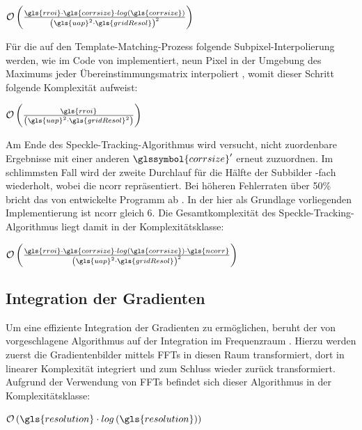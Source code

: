 \begin{center}
	$\mathcal{O}\left(\frac{\gls{rroi} \cdot \gls{corrsize} \cdot log\left(\gls{corrsize}\right)}{\left(\gls{uap}^2 \cdot \gls{gridResol}\right)^2}\right)$
\end{center}

Für die auf den Template-Matching-Prozess folgende Subpixel-Interpolierung werden, wie im Code von \citeauthor{Coj17} implementiert, neun Pixel in der Umgebung des Maximums jeder Übereinstimmungsmatrix interpoliert \cite{Coj17}, womit dieser Schritt folgende Komplexität aufweist:

\begin{center}
	$\mathcal{O}\left(\frac{\gls{rroi}}{\left(\gls{uap}^2 \cdot \gls{gridResol}^2\right)}\right)$
\end{center}

Am Ende des Speckle-Tracking-Algorithmus wird versucht, nicht zuordenbare Ergebnisse mit einer anderen  $\glssymbol{corrsize}'$ erneut zuzuordnen. Im schlimmsten Fall wird der zweite Durchlauf für die Hälfte der Subbilder -fach wiederholt, wobei  die \gls{ncorr} repräsentiert. Bei höheren Fehlerraten über 50\% bricht das von \citeauthor{Coj17} entwickelte Programm ab \cite{Coj17}. In der hier als Grundlage vorliegenden Implementierung ist \gls{ncorr} gleich 6. Die Gesamtkomplexität des Speckle-Tracking-Algorithmus liegt damit in der Komplexitätsklasse:

\begin{center}
	$\mathcal{O}\left(\frac{\gls{rroi} \cdot \gls{corrsize} \cdot log\left(\gls{corrsize}\right) \cdot \gls{ncorr}}{\left(\gls{uap}^2 \cdot \gls{gridResol}\right)^2}\right)$
\end{center}

\subsection{Integration der Gradienten}

Um eine effiziente Integration der Gradienten zu ermöglichen, beruht der von \citeauthor{FC88} vorgeschlagene Algorithmus auf der Integration im Frequenzraum \cite{FC88}. Hierzu werden zuerst die Gradientenbilder mittels \glspl{FFT} in diesen Raum transformiert, dort in linearer Komplexität integriert und zum Schluss wieder zurück transformiert. Aufgrund der Verwendung von \glspl{FFT} befindet sich dieser Algorithmus in der Komplexitätsklasse:

\begin{center}
	$\mathcal{O}\left(\gls{resolution} \cdot log\left(\gls{resolution}\right)\right)$
\end{center}

